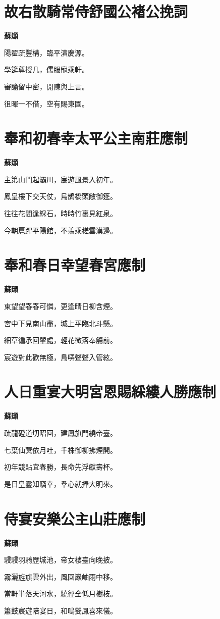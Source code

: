\documentclass[12pt,a4paper]{ctexbook}
\begin{document}
\section{故右散騎常侍舒國公褚公挽詞}
\textbf{蘇頲}\par\vspace{0.5em}
陽翟疏豐構，臨平演慶源。\par
學筵尊授几，儒服寵乘軒。\par
審諭留中密，開陳與上言。\par
徂暉一不借，空有賜東園。\par

\section{奉和初春幸太平公主南莊應制}
\textbf{蘇頲}\par\vspace{0.5em}
主第山門起灞川，宸遊風景入初年。\par
鳳皇樓下交天仗，烏鵲橋頭敞御筵。\par
往往花間逢綵石，時時竹裏見紅泉。\par
今朝扈蹕平陽館，不羨乘槎雲漢邊。\par

\section{奉和春日幸望春宮應制}
\textbf{蘇頲}\par\vspace{0.5em}
東望望春春可憐，更逢晴日柳含煙。\par
宮中下見南山盡，城上平臨北斗懸。\par
細草徧承回輦處，輕花微落奉觴前。\par
宸遊對此歡無極，鳥哢聲聲入管絃。\par

\section{人日重宴大明宮恩賜綵縷人勝應制}
\textbf{蘇頲}\par\vspace{0.5em}
疏龍磴道切昭回，建鳳旗門繞帝臺。\par
七葉仙蓂依月吐，千株御柳拂煙開。\par
初年競貼宜春勝，長命先浮獻壽杯。\par
是日皇靈知竊幸，羣心就捧大明來。\par

\section{侍宴安樂公主山莊應制}
\textbf{蘇頲}\par\vspace{0.5em}
駸駸羽騎歷城池，帝女樓臺向晚披。\par
霧灑旌旗雲外出，風回巖岫雨中移。\par
當軒半落天河水，繞徑全低月樹枝。\par
簫鼓宸遊陪宴日，和鳴雙鳳喜來儀。\par
\end{document}
